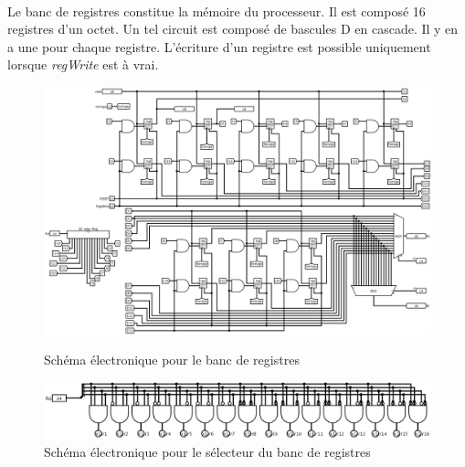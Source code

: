 \paragraph{}{
	Le banc de registres constitue la mémoire du processeur.
	Il est composé 16 registres d'un octet. Un tel circuit
	est composé de bascules D en cascade. Il y en a une pour
	chaque registre.
	L'écriture d'un registre est possible uniquement lorsque
	\textit{regWrite} est à vrai.
}

\begin{figure}
	\centering
	\includegraphics[scale=0.3,angle=90,origin=c]{circuits/banc_reg.png}
	\label{banc_reg_circ}
	\caption{Sch\'{e}ma \'{e}lectronique pour le banc de registres}
\end{figure}

\begin{figure}
	\centering
	\includegraphics[scale=0.3,origin=c]{circuits/banc_reg_selec.png}
	\caption{
		\label{banc_reg_selec_circ}
		Sch\'{e}ma \'{e}lectronique pour le sélecteur du banc de registres
	}
\end{figure}